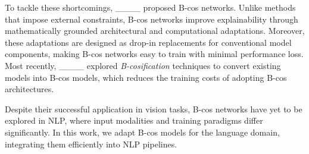 To tackle these shortcomings, ____ proposed B-cos networks. 
Unlike methods that impose external constraints, B-cos networks improve explainability through mathematically grounded architectural and computational adaptations. 
Moreover, these adaptations are designed as drop-in replacements for conventional model components, making B-cos networks easy to train with minimal performance loss. Most recently, ____ explored \textit{B-cosification} techniques to convert existing models into B-cos models, which reduces the training costs of adopting B-cos architectures. 

Despite their successful application in vision tasks, B-cos networks have yet to be explored in NLP, where input modalities and training paradigms differ significantly. 
In this work, we adapt B-cos models for the language domain, integrating them efficiently into NLP pipelines. 

\begin{table*}[ht]
    \centering
    \caption{Comparison between conventional fine-tuning, B-cosification in computer vision and B-cosification in NLP (B-cos LM). 
    Conventional fine-tuning and B-cosification follow the configuration of BERT for sequence classification and CLIP____, respectively (cf. \S~\ref{sec:methodology} for details).}
    \label{tab:comparison}
\end{table*}

